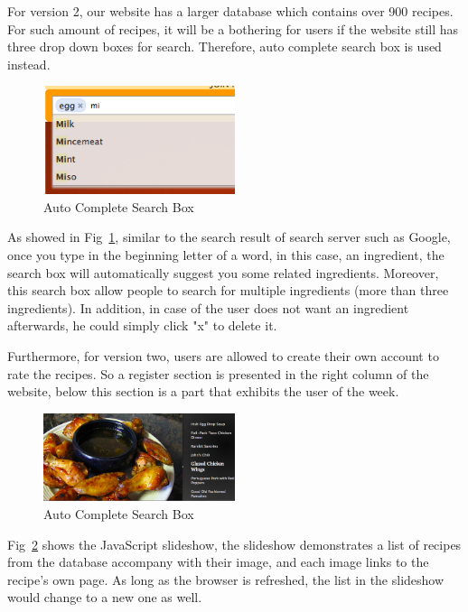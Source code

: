 For version 2, our website has a larger database which contains over 900 recipes. For such amount of recipes, it will be a bothering for users if the website still has three drop down boxes for search. Therefore, auto complete search box is used instead. 

\begin{figure}[h]
\includegraphics[width=0.5\textwidth]{auto_complete}
\caption{Auto Complete Search Box}
\label{fig:auto_complete}
\end{figure}

As showed in Fig~\ref{fig:auto_complete}, similar to the search result of search server such as Google, once you type in the beginning letter of a word, in this case, an ingredient, the search box will automatically suggest you some related ingredients. Moreover, this search box allow people to search for multiple ingredients (more than three ingredients). In addition, in case of the user does not want an ingredient afterwards, he could simply click "x" to delete it.

Furthermore, for version two, users are allowed to create their own account to rate the recipes. So a register section is presented in the right column of the website, below this section is a part that exhibits the user of the week. 

\begin{figure}[H]
\includegraphics[width=0.5\textwidth]{slideshow}
\caption{Auto Complete Search Box}
\label{fig:slideshow}
\end{figure}

Fig~\ref{fig:slideshow} shows the JavaScript slideshow, the slideshow demonstrates a list of recipes from the database accompany with their image, and each image links to the recipe's own page. As long as the browser is refreshed, the list in the slideshow would change to a new one as well. 

